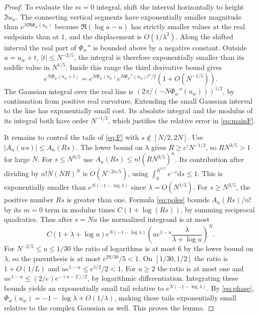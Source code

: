 \documentclass[11pt]{article}
\newcommand{\dd}{\mathrm d}
\begin{document}
\begin{proof}
To evaluate the \(m=0\) integral, shift the interval horizontally to height \(\Im u_w\). The connecting vertical segments have exponentially smaller magnitude than \(e^{N\Re\Phi_w(u_w)}\) because \(\Re(\log u-u)\) has strictly smaller values at the real endpoints than at \(1\), and the displacement is \(O(1/\lambda^2)\). Along the shifted interval the real part of \(\Phi_w''\) is bounded above by a negative constant. Outside \(u=u_w+t\), \(|t|\le N^{-2/5}\), the integral is therefore exponentially smaller than its saddle value in \(N^{1/5}\). Inside this range the third derivative bound gives
\[
 e^{N\Phi_w(u_w+t)}=e^{N\Phi_w(u_w)}
          e^{N\Phi_w''(u_w)t^2/2}(1+O(N^{-1/5})).
\]
The Gaussian integral over the real line is \((2\pi/(-N\Phi_w''(u_w)))^{1/2}\), by continuation from positive real curvature. Extending the small Gaussian interval to the line has exponentially small cost. Its absolute integral and the modulus of its integral both have order \(N^{-1/2}\), which justifies the relative error in \eqref{eq:mainF}.

It remains to control the tails of \eqref{eq:F} with \(s\notin[N/2,2N]\). Use \(|A_n(ws)|\le A_n(Rs)\). The lower bound on \(\lambda\) gives \(R\ge c'N^{-1/2}\), so \(RN^{3/5}>1\) for large \(N\). For \(s\le N^{3/5}\) use \(A_n(Rs)\le n!(RN^{3/5})^n\). Its contribution after dividing by \(n!N(NR)^N\) is \(O(N^{-2n/5})\), using \(\int_0^{N^{3/5}}e^{-s}\dd s\le1\). This is exponentially smaller than \(e^{N(-1-\log\lambda)}\) since \(\lambda=O(N^{1/3})\). For \(s\ge N^{3/5}\), the positive number \(Rs\) is greater than one. Formula \eqref{eq:poles} bounds \(A_n(Rs)/n!\) by its \(m=0\) term in modulus times \(C(1+\log(Rs))\), by summing reciprocal quadratics. Thus after \(s=Nu\) the normalized integrand is at most
\begin{equation}\label{eq:tails}
 C(1+\lambda+\log u)e^{N(-1-\log\lambda)}
       \left(u e^{1-u}\frac{\lambda}{\lambda+\log u}\right)^N.
\end{equation}
For \(N^{-2/5}\le u\le1/30\) the ratio of logarithms is at most \(6\) by the lower bound on \(\lambda\), so the parenthesis is at most \(e^{29/30}/5<1\). On \([1/30,1/2]\) the ratio is \(1+O(1/L)\) and \(u e^{1-u}\le e^{1/2}/2<1\). For \(u\ge2\) the ratio is at most one and \(u e^{1-u}\le(2/e)e^{-(u-2)/2}\), by logarithmic differentiation. Integrating these bounds yields an exponentially small tail relative to \(e^{N(-1-\log\lambda)}\). By \eqref{eq:phase}, \(\Phi_w(u_w)=-1-\log\lambda+O(1/\lambda)\), making these tails exponentially small relative to the complex Gaussian as well. This proves the lemma.
\end{proof}
\end{document}
